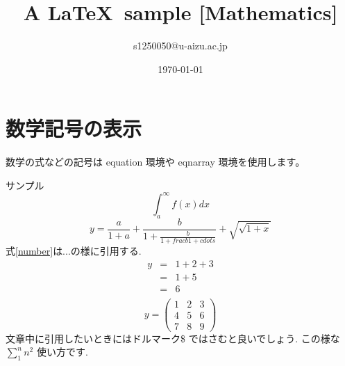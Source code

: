 \documentclass[a4paper]{jarticle}
\title{A \LaTeX ~sample [Mathematics]}
\author{s1250050@u-aizu.ac.jp}
\date{\today}
\begin{document}
\maketitle
\section{数学記号の表示}
数学の式などの記号は equation 環境や eqnarray 環境を使用します。

サンプル
\begin{equation}
\int_a^{\infty} f(x) dx
\end{equation}
\begin{equation} \label{number}
y =\frac{a}{1+a} +
\frac{b}{1+\frac{b}{1+frac{b}{1+cdots}}} +
\sqrt{\sqrt{1+x}}
\end{equation}
式\ref{number}は...の様に引用する.
\begin{eqnarray*}
y &=& 1+2+3 \\
	&=& 1+5 \\
	&=& 6 \\
\end{eqnarray*}
\begin{equation} \label{matrix}
		y = \left(
			\begin{array}{rrr}
				1 & 2 & 3 \\
				4 & 5 & 6 \\
				7 & 8 & 9
			\end{array}
			\right)
\end{equation}
文章中に引用したいときにはドルマーク\$ ではさむと良いでしょう.
この様な $\sum_1^n n^2$ 使い方です.
\end{document}
